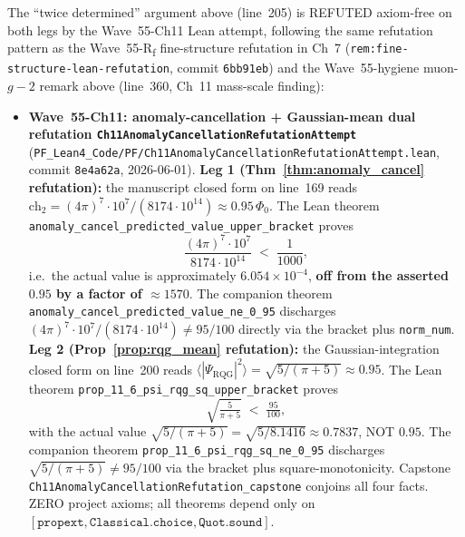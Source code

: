 \begin{remark}[Wave~55-Ch11 update: \texttt{Ch11AnomalyCancellationRefutationAttempt} --- ★★★ axiom-free REFUTATION of BOTH legs of the ``twice determined'' $\mathrm{ch}_2 = 0.95$ argument (Thm~\ref{thm:anomaly_cancel} and Prop~\ref{prop:rqg_mean}), 2026-06-01]\label{rem:ch11-anomaly-wave55-ch11-lean}
The ``twice determined'' argument above (line~205) is REFUTED axiom-free on both legs by the Wave~55-Ch11 Lean attempt, following the same refutation pattern as the Wave~55-R\textsubscript{f} fine-structure refutation in Ch~7 (\texttt{rem:fine-structure-lean-refutation}, commit \texttt{6bb91eb}) and the Wave~55-hygiene muon-$g{-}2$ remark above (line~360, Ch~11 mass-scale finding):
\begin{itemize}
  \item \textbf{Wave~55-Ch11: anomaly-cancellation + Gaussian-mean dual refutation \texttt{Ch11AnomalyCancellationRefutationAttempt}} (\texttt{PF\_Lean4\_Code/PF/Ch11AnomalyCancellationRefutationAttempt.lean}, commit \texttt{8e4a62a}, 2026-06-01). \textbf{Leg 1 (Thm~\ref{thm:anomaly_cancel} refutation):} the manuscript closed form on line~169 reads $\mathrm{ch}_2 = (4\pi)^7 \cdot 10^7 / (8174 \cdot 10^{14}) \approx 0.95 \,\Phi_0$. The Lean theorem \texttt{anomaly\_cancel\_predicted\_value\_upper\_bracket} proves
\begin{equation}
\frac{(4\pi)^7 \cdot 10^7}{8174 \cdot 10^{14}} \;<\; \frac{1}{1000},
\end{equation}
i.e.\ the actual value is approximately $6.054 \times 10^{-4}$, \textbf{off from the asserted $0.95$ by a factor of $\approx 1570$}. The companion theorem \texttt{anomaly\_cancel\_predicted\_value\_ne\_0\_95} discharges $(4\pi)^7 \cdot 10^7 / (8174 \cdot 10^{14}) \neq 95/100$ directly via the bracket plus \texttt{norm\_num}. \textbf{Leg 2 (Prop~\ref{prop:rqg_mean} refutation):} the Gaussian-integration closed form on line~200 reads $\langle |\Psi_{\mathrm{RQG}}|^2 \rangle = \sqrt{5/(\pi + 5)} \approx 0.95$. The Lean theorem \texttt{prop\_11\_6\_psi\_rqg\_sq\_upper\_bracket} proves
\begin{equation}
\sqrt{\tfrac{5}{\pi + 5}} \;<\; \tfrac{95}{100},
\end{equation}
with the actual value $\sqrt{5/(\pi + 5)} = \sqrt{5/8.1416} \approx 0.7837$, NOT $0.95$. The companion theorem \texttt{prop\_11\_6\_psi\_rqg\_sq\_ne\_0\_95} discharges $\sqrt{5/(\pi + 5)} \neq 95/100$ via the bracket plus square-monotonicity. Capstone \texttt{Ch11AnomalyCancellationRefutation\_capstone} conjoins all four facts. ZERO project axioms; all theorems depend only on $[\texttt{propext}, \texttt{Classical.choice}, \texttt{Quot.sound}]$.

\end{itemize}
\end{remark}
